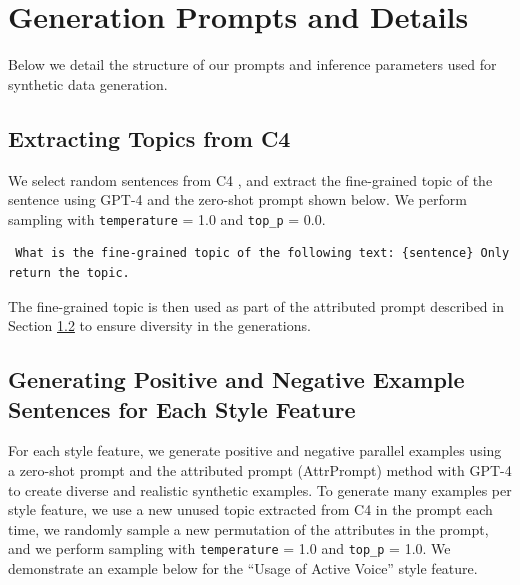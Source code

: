 \newpage
\section{Generation Prompts and Details}
\label{sec:appendix:generationdetails}

Below we detail the structure of our prompts and inference parameters used for synthetic data generation.

\subsection{Extracting Topics from C4}
\label{sec:extracttopic}

We select random sentences from C4 \citep{t5andc4}, and extract the fine-grained topic of the sentence using GPT-4 \citep{gpt4} and the zero-shot prompt shown below. We perform sampling with \texttt{temperature} = 1.0 and \texttt{top\_p} = 0.0.

\vspace{1em}
{\small
\begin{verbatim}
 What is the fine-grained topic of the following text: {sentence} Only return the topic.    
\end{verbatim}}
\vspace{1em}

\noindent The fine-grained topic is then used as part of the attributed prompt described in Section \ref{sec:genposandneg} to ensure diversity in the generations.

\subsection{Generating Positive and Negative Example Sentences for Each Style Feature}
\label{sec:genposandneg}

For each style feature, we generate positive and negative parallel examples using a zero-shot prompt and the attributed prompt (AttrPrompt) method \citep{attrprompt} with GPT-4 to create diverse and realistic synthetic examples. To generate many examples per style feature, we use a new unused topic extracted from C4 in the prompt each time, we randomly sample a new permutation of the attributes in the prompt, and we perform sampling with \texttt{temperature} = 1.0 and \texttt{top\_p} = 1.0. We demonstrate an example below for the ``Usage of Active Voice'' style feature.

